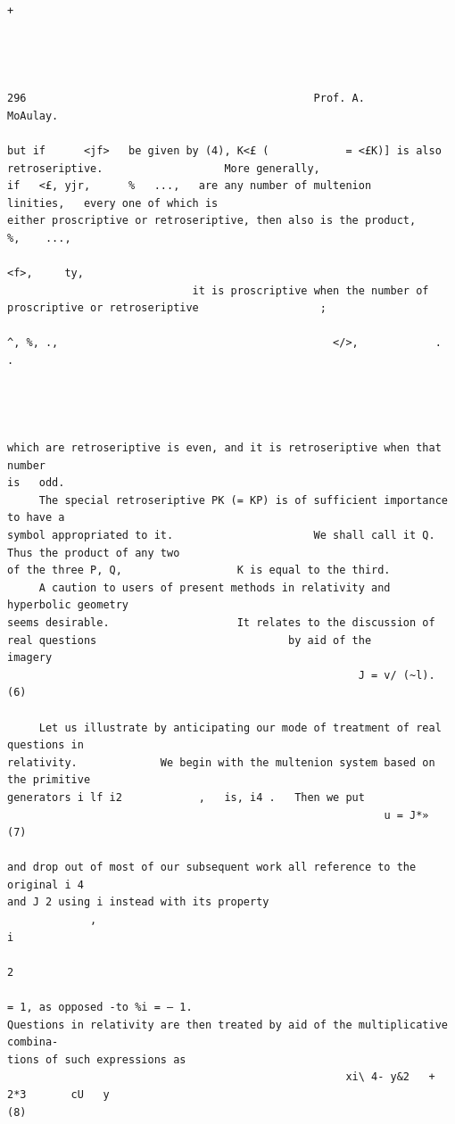\documentclass[10pt]{article}
\begin{document}
\begin{verbatim}

                                                                          +




296                                             Prof. A.           MoAulay.

but if      <jf>   be given by (4), K<£ (            = <£K)] is also retroseriptive.                   More generally,
if   <£, yjr,      %   ...,   are any number of multenion                         linities,   every one of which is
either proscriptive or retroseriptive, then also is the product,                                                                   %,    ...,
                                                                                                                 <f>,     ty,
                             it is proscriptive when the number of
proscriptive or retroseriptive                   ;
                                                                     ^, %, .,                                           </>,            .   .




which are retroseriptive is even, and it is retroseriptive when that number
is   odd.
     The special retroseriptive PK (= KP) is of sufficient importance to have a
symbol appropriated to it.                      We shall call it Q.                    Thus the product of any two
of the three P, Q,                  K is equal to the third.
     A caution to users of present methods in relativity and hyperbolic geometry
seems desirable.                    It relates to the discussion of real questions                              by aid of the
imagery
                                                       J = v/ (~l).                                                                     (6)

     Let us illustrate by anticipating our mode of treatment of real questions in
relativity.             We begin with the multenion system based on the primitive
generators i lf i2            ,   is, i4 .   Then we put
                                                           u = J*»                                                                       (7)

and drop out of most of our subsequent work all reference to the original i 4
and J 2 using i instead with its property
             ,                                                            i
                                                                              2
                                                                                  = 1, as opposed -to %i = — 1.
Questions in relativity are then treated by aid of the multiplicative combina-
tions of such expressions as
                                                     xi\ 4- y&2   + 2*3       cU   y                                                     (8)


\end{verbatim}
\end{document}
